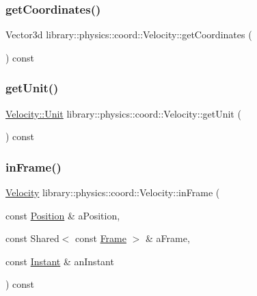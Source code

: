 \mbox{\label{classlibrary_1_1physics_1_1coord_1_1_velocity_a1ac18f97a304ac026c2544292b89e030}} 
\subsubsection{\texorpdfstring{get\+Coordinates()}{getCoordinates()}}
{\footnotesize\ttfamily Vector3d library\+::physics\+::coord\+::\+Velocity\+::get\+Coordinates (\begin{DoxyParamCaption}{ }\end{DoxyParamCaption}) const}

\mbox{\label{classlibrary_1_1physics_1_1coord_1_1_velocity_aa04a5b82a46d5ea4e92bf53046a18494}} 
\subsubsection{\texorpdfstring{get\+Unit()}{getUnit()}}
{\footnotesize\ttfamily \hyperlink{classlibrary_1_1physics_1_1coord_1_1_velocity_a8bbc811932c454dbe0ab8b56f1b2c0b3}{Velocity\+::\+Unit} library\+::physics\+::coord\+::\+Velocity\+::get\+Unit (\begin{DoxyParamCaption}{ }\end{DoxyParamCaption}) const}

\mbox{\label{classlibrary_1_1physics_1_1coord_1_1_velocity_ac2e825fe682f526884764218425a14b7}} 
\subsubsection{\texorpdfstring{in\+Frame()}{inFrame()}}
{\footnotesize\ttfamily \hyperlink{classlibrary_1_1physics_1_1coord_1_1_velocity}{Velocity} library\+::physics\+::coord\+::\+Velocity\+::in\+Frame (\begin{DoxyParamCaption}\item[{const \hyperlink{classlibrary_1_1physics_1_1coord_1_1_position}{Position} \&}]{a\+Position,  }\item[{const Shared$<$ const \hyperlink{classlibrary_1_1physics_1_1coord_1_1_frame}{Frame} $>$ \&}]{a\+Frame,  }\item[{const \hyperlink{classlibrary_1_1physics_1_1time_1_1_instant}{Instant} \&}]{an\+Instant }\end{DoxyParamCaption}) const}


